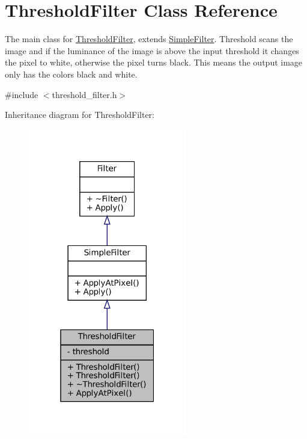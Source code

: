 \hypertarget{classThresholdFilter}{}\section{Threshold\+Filter Class Reference}
\label{classThresholdFilter}


The main class for \hyperlink{classThresholdFilter}{Threshold\+Filter}, extends \hyperlink{classSimpleFilter}{Simple\+Filter}. Threshold scans the image and if the luminance of the image is above the input threshold it changes the pixel to white, otherwise the pixel turns black. This means the output image only has the colors black and white.  




{\ttfamily \#include $<$threshold\+\_\+filter.\+h$>$}



Inheritance diagram for Threshold\+Filter\+:\nopagebreak
\begin{figure}[H]
\begin{center}
\leavevmode
\includegraphics[width=196pt]{classThresholdFilter__inherit__graph}
\end{center}
\end{figure}



